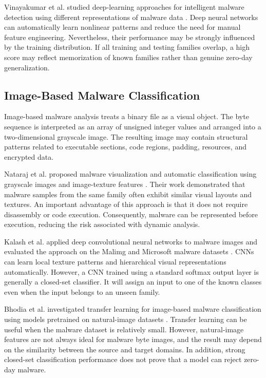 \documentclass[12pt,a4paper]{article}
\begin{document}
Vinayakumar et al. studied deep-learning approaches for intelligent malware detection using different representations of malware data \citep{vinayakumar2019}. Deep neural networks can automatically learn nonlinear patterns and reduce the need for manual feature engineering. Nevertheless, their performance may be strongly influenced by the training distribution. If all training and testing families overlap, a high score may reflect memorization of known families rather than genuine zero-day generalization.

\subsection{Image-Based Malware Classification}

Image-based malware analysis treats a binary file as a visual object. The byte sequence is interpreted as an array of unsigned integer values and arranged into a two-dimensional grayscale image. The resulting image may contain structural patterns related to executable sections, code regions, padding, resources, and encrypted data.

Nataraj et al. proposed malware visualization and automatic classification using grayscale images and image-texture features \citep{nataraj2011}. Their work demonstrated that malware samples from the same family often exhibit similar visual layouts and textures. An important advantage of this approach is that it does not require disassembly or code execution. Consequently, malware can be represented before execution, reducing the risk associated with dynamic analysis.

Kalash et al. applied deep convolutional neural networks to malware images and evaluated the approach on the Malimg and Microsoft malware datasets \citep{kalash2018}. CNNs can learn local texture patterns and hierarchical visual representations automatically. However, a CNN trained using a standard softmax output layer is generally a closed-set classifier. It will assign an input to one of the known classes even when the input belongs to an unseen family.

Bhodia et al. investigated transfer learning for image-based malware classification using models pretrained on natural-image datasets \citep{bhodia2019}. Transfer learning can be useful when the malware dataset is relatively small. However, natural-image features are not always ideal for malware byte images, and the result may depend on the similarity between the source and target domains. In addition, strong closed-set classification performance does not prove that a model can reject zero-day malware.
\end{document}
